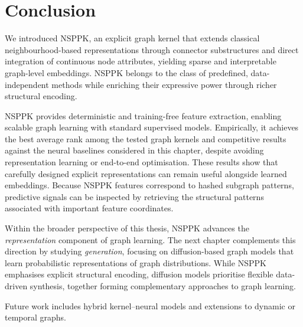\section{Conclusion}
\label{sec:Conclusion}

We introduced NSPPK, an explicit graph kernel that extends classical
neighbourhood-based representations through connector substructures and direct
integration of continuous node attributes, yielding sparse and interpretable
graph-level embeddings.  NSPPK belongs to the class of predefined,
data-independent methods while enriching their expressive power through richer
structural encoding.

NSPPK provides deterministic and training-free feature extraction, enabling
scalable graph learning with standard supervised models. Empirically, it
achieves the best average rank among the tested graph kernels and competitive
results against the neural baselines considered in this chapter, despite
avoiding representation learning or end-to-end optimisation. These results show
that carefully designed explicit representations can remain useful alongside
learned embeddings. Because NSPPK features correspond to hashed subgraph
patterns, predictive signals can be inspected by retrieving the structural
patterns associated with important feature coordinates.

Within the broader perspective of this thesis, NSPPK advances the
\emph{representation} component of graph learning. The next chapter complements
this direction by studying \emph{generation}, focusing on diffusion-based graph
models that learn probabilistic representations of graph distributions. While
NSPPK emphasises explicit structural encoding, diffusion models prioritise
flexible data-driven synthesis, together forming complementary approaches to
graph learning.

Future work includes hybrid kernel–neural models and extensions to dynamic or
temporal graphs.
